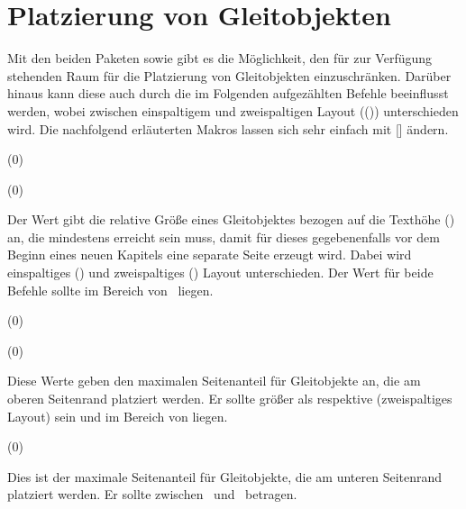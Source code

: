 \section{%
  Platzierung von Gleitobjekten%
  \label{sec:tips:floats}%
}

Mit den beiden Paketen  sowie  gibt es die 
Möglichkeit, den für  zur Verfügung stehenden Raum für die 
Platzierung von Gleitobjekten einzuschränken. Darüber hinaus kann diese auch 
durch die im Folgenden aufgezählten Befehle beeinflusst werden, wobei zwischen 
einspaltigem und zweispaltigen Layout (()) 
unterschieden wird. Die nachfolgend erläuterten Makros lassen sich sehr 
einfach mit [] ändern. 

\begin{Declaration}
  {}
  (0\floatpagefraction)
\begin{Declaration}
  {}
  (0\dblfloatpagefraction)
\printdeclarationlist

Der Wert gibt die relative Größe eines Gleitobjektes bezogen auf die Texthöhe 
() an, die mindestens erreicht sein muss, damit für dieses 
gegebenenfalls vor dem Beginn eines neuen Kapitels eine separate Seite erzeugt 
wird. Dabei wird einspaltiges () und zweispaltiges 
() Layout unterschieden. Der Wert für beide 
Befehle sollte im Bereich von~ liegen.
\end{Declaration}
\end{Declaration}

\begin{Declaration}
  {}
  (0\topfraction)
\begin{Declaration}
  {}
  (0\dbltopfraction)
\printdeclarationlist

Diese Werte geben den maximalen Seitenanteil für Gleitobjekte an, die am oberen 
Seitenrand platziert werden. Er sollte größer als  
respektive  (zweispaltiges Layout) sein und im 
Bereich von  liegen. 
\end{Declaration}
\end{Declaration}

\begin{Declaration}
  {}
  (0\bottomfraction)
\printdeclarationlist

Dies ist der maximale Seitenanteil für Gleitobjekte, die am unteren Seitenrand 
platziert werden. Er sollte zwischen~ und~ betragen.
\end{Declaration}

